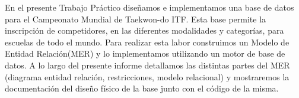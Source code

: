 En el presente Trabajo Práctico diseñamos e implementamos una base de datos para el Campeonato Mundial de Taekwon-do ITF. Esta
base permite la inscripción de competidores, en las diferentes modalidades y categorías, para escuelas de todo el mundo.
Para realizar esta labor construimos un Modelo de Entidad Relación(MER) y lo implementamos utilizando un motor de base
de datos. A lo largo del presente informe detallamos las distintas partes del MER (diagrama entidad relación, restricciones,
modelo relacional) y mostraremos la documentación del diseño físico de la base junto con el código de la misma.
